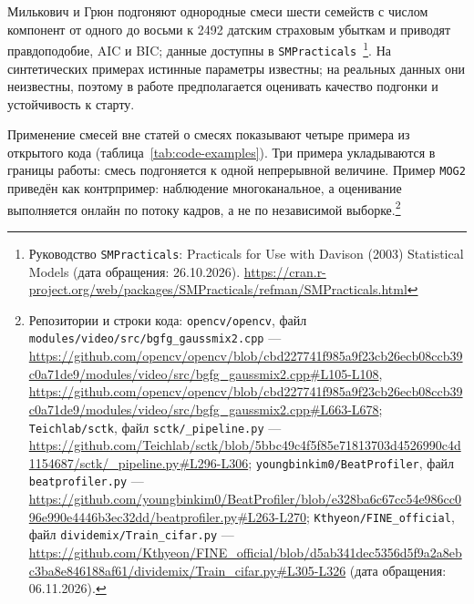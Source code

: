 Милькович и Грюн подгоняют однородные смеси шести семейств с числом компонент от одного до восьми к 2492 датским страховым убыткам и приводят правдоподобие, AIC и BIC; данные доступны в \texttt{SMPracticals}~\cite{MiljkovicGrun2016}\footnote{Руководство \texttt{SMPracticals}: Practicals for Use with Davison (2003) Statistical Models (дата обращения: 26.10.2026). \url{https://cran.r-project.org/web/packages/SMPracticals/refman/SMPracticals.html}}. На синтетических примерах истинные параметры известны; на реальных данных они неизвестны, поэтому в работе предполагается оценивать качество подгонки и устойчивость к старту.

Применение смесей вне статей о смесях показывают четыре примера из открытого кода (таблица~\ref{tab:code-examples}). Три примера укладываются в границы работы: смесь подгоняется к одной непрерывной величине. Пример \texttt{MOG2} приведён как контрпример: наблюдение многоканальное, а оценивание выполняется онлайн по потоку кадров, а не по независимой выборке.\footnote{Репозитории и строки кода: \texttt{opencv/opencv}, файл \texttt{modules/video/src/bgfg\_gaussmix2.cpp} --- \url{https://github.com/opencv/opencv/blob/cbd227741f985a9f23cb26ecb08ccb39c0a71de9/modules/video/src/bgfg_gaussmix2.cpp\#L105-L108}, \url{https://github.com/opencv/opencv/blob/cbd227741f985a9f23cb26ecb08ccb39c0a71de9/modules/video/src/bgfg_gaussmix2.cpp\#L663-L678}; \texttt{Teichlab/sctk}, файл \texttt{sctk/\_pipeline.py} --- \url{https://github.com/Teichlab/sctk/blob/5bbc49c4f5f85e71813703d4526990c4d1154687/sctk/_pipeline.py\#L296-L306}; \texttt{youngbinkim0/BeatProfiler}, файл \texttt{beatprofiler.py} --- \url{https://github.com/youngbinkim0/BeatProfiler/blob/e328ba6c67cc54e986cc096e990e4446b3ec32dd/beatprofiler.py\#L263-L270}; \texttt{Kthyeon/FINE\_official}, файл \texttt{dividemix/Train\_cifar.py} --- \url{https://github.com/Kthyeon/FINE_official/blob/d5ab341dec5356d5f9a2a8ebc3ba8e846188af61/dividemix/Train_cifar.py\#L305-L326} (дата обращения: 06.11.2026).}

